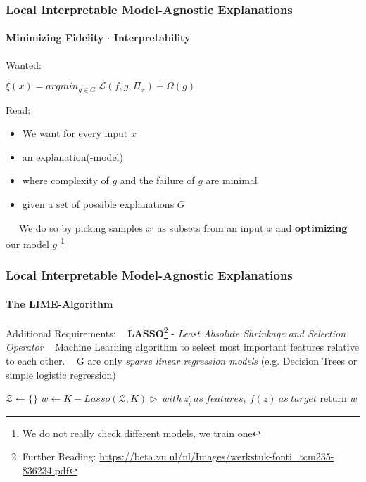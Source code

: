 \begin{frame}
	\frametitle{Local Interpretable Model-Agnostic Explanations}
	\framesubtitle{Minimizing Fidelity $\cdot$ Interpretability}
	\begin{Large}
		Wanted: ~\newline
		\begin{center}
			$\xi(x) = argmin_{g\in G} ~ \mathcal{L}(f,g,\Pi_x) + \Omega(g)$
		\end{center}
		Read: 
		\begin{itemize}
			\item We want for every input $x$
			\item an explanation(-model)
			\item where complexity of $g$ and the failure of $g$ are minimal
			\item given a set of possible explanations $G$
		\end{itemize}
	\end{Large}
~\newline ~\newline 
We do so by picking samples $x^,$ as subsets from an input $x$ and \textbf{optimizing} our model $g$ \footnote{We do not really check different models, we train one} 
\end{frame}

\begin{frame}
	\frametitle{Local Interpretable Model-Agnostic Explanations}
	\framesubtitle{The LIME-Algorithm}
	Additional Requirements: ~\newline 
	\textbf{LASSO}\footnote{Further Reading: \url{https://beta.vu.nl/nl/Images/werkstuk-fonti_tcm235-836234.pdf}} - \textit{Least Absolute Shrinkage and Selection Operator} ~\newline 
	Machine Learning algorithm to select most important features relative to each other. ~\newline
	G are only \textit{sparse linear regression models} (e.g. Decision Trees or simple logistic regression) ~\newline 
	
	\begin{algorithm}[H]
		$\mathcal{Z} \leftarrow \{\}$\;
		$ w \leftarrow K-Lasso(\mathcal{Z},K)  \triangleright~ with~ z^,_i~ as~ features,~ f(z) ~ as ~ target$\;
		return  $w$\;
	\end{algorithm}

\end{frame}

